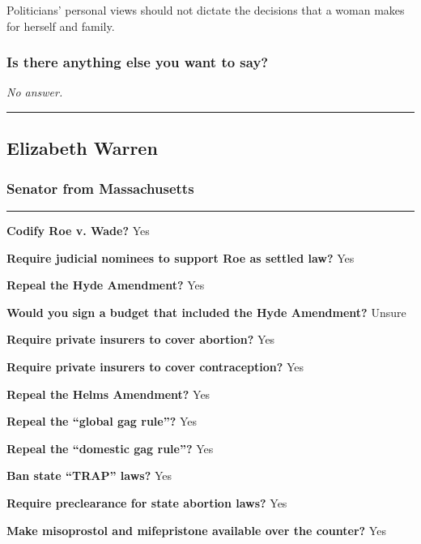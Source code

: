 Politicians' personal views should not dictate the decisions that a
woman makes for herself and family.

\hypertarget{is-there-anything-else-you-want-to-say-6}{%
\subsubsection{Is there anything else you want to
say?}\label{is-there-anything-else-you-want-to-say-6}}

\emph{No answer.}

\begin{center}\rule{0.5\linewidth}{\linethickness}\end{center}

\hypertarget{elizabeth-warren}{%
\subsection{Elizabeth Warren}\label{elizabeth-warren}}

\hypertarget{senator-from-massachusetts}{%
\subsubsection{Senator from
Massachusetts}\label{senator-from-massachusetts}}

\begin{center}\rule{0.5\linewidth}{\linethickness}\end{center}

\textbf{Codify Roe v. Wade?} Yes

\textbf{Require judicial nominees to support Roe as settled law?} Yes

\textbf{Repeal the Hyde Amendment?} Yes

\textbf{Would you sign a budget that included the Hyde Amendment?}
Unsure

\textbf{Require private insurers to cover abortion?} Yes

\textbf{Require private insurers to cover contraception?} Yes

\textbf{Repeal the Helms Amendment?} Yes

\textbf{Repeal the ``global gag rule''?} Yes

\textbf{Repeal the ``domestic gag rule''?} Yes

\textbf{Ban state ``TRAP'' laws?} Yes

\textbf{Require preclearance for state abortion laws?} Yes

\textbf{Make misoprostol and mifepristone available over the counter?}
Yes

